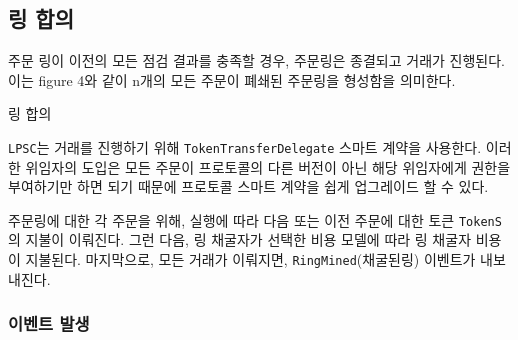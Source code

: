 \documentclass{article}
\makeatletter
\newenvironment{figurehere}
{\def\@captype{figure}}
{}
\makeatother
\begin{document}
\begin{multicols}{2}
\subsection{링 합의\label{sec:settlement}}

주문 링이 이전의 모든 점검 결과를 충족할 경우, 주문링은 종결되고 거래가 진행된다. 이는 figure 4와 같이 n개의 모든 주문이 폐쇄된 주문링을 형성함을 의미한다.

\begin{center}
	\begin{figurehere}
		\centering
		
	\caption{링 합의}
	\label{fig:settlement}
	\end{figurehere}
\end{center}

\verb|LPSC|는 거래를 진행하기 위해 \verb|TokenTransferDelegate| 스마트 계약을 사용한다. 이러한 위임자의 도입은 모든 주문이 프로토콜의 다른 버전이 아닌 해당 위임자에게 권한을 부여하기만 하면 되기 때문에 프로토콜 스마트 계약을 쉽게 업그레이드 할 수 있다.

주문링에 대한 각 주문을 위해, 실행에 따라 다음 또는 이전 주문에 대한 토큰 \verb|TokenS|의 지불이 이뤄진다. 그런 다음, 링 채굴자가 선택한 비용 모델에 따라 링 채굴자 비용이 지불된다. 마지막으로, 모든 거래가 이뤄지면, \verb|RingMined|(채굴된링) 이벤트가 내보내진다.

\subsubsection{이벤트 발생\label{sec:events}}


\end{multicols}
\end{document}
